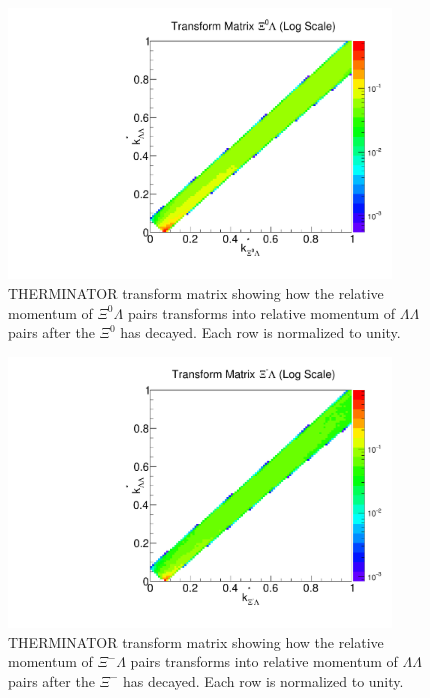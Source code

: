\begin{figure}[hbtp]
\begin{center}
\includegraphics[width=24pc]{Figures/TransformMatrices/2016-7-20-TransformMatrixXi0LambdaNormLog.pdf}
\end{center}
\caption[Transform matrix for $k^*_{\Xi^0\Lambda} \rightarrow k^*_{\Lambda\Lambda}$]{THERMINATOR \cite{Chojnacki:2011hb} transform matrix showing how the relative momentum of $\Xi^0\Lambda$ pairs transforms into relative momentum of $\Lambda\Lambda$ pairs after the $\Xi^0$ has decayed. Each row is normalized to unity.}
\label{fig:TherminatorX0L}
\end{figure}

\begin{figure}[hbtp]
\begin{center}
\includegraphics[width=24pc]{Figures/TransformMatrices/2016-7-20-TransformMatrixXiCLambdaNormLog.pdf}
\end{center}
\caption[Transform matrix for $k^*_{\Xi^-\Lambda} \rightarrow k^*_{\Lambda\Lambda}$]{THERMINATOR \cite{Chojnacki:2011hb} transform matrix showing how the relative momentum of $\Xi^-\Lambda$ pairs transforms into relative momentum of $\Lambda\Lambda$ pairs after the $\Xi^-$ has decayed. Each row is normalized to unity.}
\label{fig:TherminatorXcL}
\end{figure}

